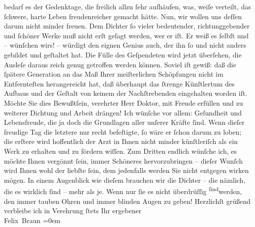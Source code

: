 \begin{ledgroupsized}[t]{13cm}
                    bedarf es der Gedenktage, die freilich allzu ſehr aufhäufen, was, weiſe
                    verteilt, das ſchwere, harte Leben freudenreicher gemacht hätte. Nun, wir wollen
                    uns deſſen darum nicht minder freuen.\pend
           \pstart
           {\pb}Dem Dichter ſo vieler bedeutender,
                    richtunggebender und ſchöner Werke muß nicht erſt geſagt werden, wer er iſt. Er
                    weiß es ſelbſt und – wünſchen wirs! – würdigt den eignen Genius auch, der ihn ſo
                    und nicht anders gebildet und geſtaltet hat. Die Fülle des Geſpendeten wird
                    jetzt überſehen, die Ausleſe daraus reich genug getroffen werden können. Soviel
                    iſt gewiß: daß die ſpätere Generation an das Maß Ihrer meiſterlichen Schöpfungen
                    nicht im Entfernteſten herangereicht hat, daß überhaupt das ſtrenge Künſtlertum
                    des Aufbaus und der Geſtalt von keinem der Nachſtrebenden eingehalten worden
                    iſt. Möchte Sie dies Bewußtſein, verehrter Herr Doktor, mit Freude erfüllen und
                    zu weiterer Dichtung und Arbeit drängen!\pend
           \pstart
           Ich wünſche vor allem: Geſundheit und Lebensfreude, die ja doch die Grundlagen
                    aller unſerer Kräfte ſind. Wenn dieſer freudige {\pb}Tag die letztere nur recht befeſtigte, ſo wäre er ſchon darum zu loben; die
                    erſtere wird hoffentlich der Arzt in Ihnen nicht minder künſtleriſch als ein
                    Werk zu erhalten und zu fördern wiſſen. Zum Dritten endlich wünſche ich, es
                    möchte Ihnen vergönnt ſein, immer Schöneres hervorzubringen – dieſer Wunſch wird
                    Ihnen wohl der liebſte ſein, dem jedenfalls werden Sie nicht entgegen wirken
                    mögen. In einem Augenblick wie dieſem brauchen wir die Dichter – die nämlich,
                    die es wirklich ſind – mehr als je. Wenn nur ſie es nicht überdrüſſig \substVorne{}\textsuperscript{ſind}\substDazwischen{}werden\substHinten{}, den immer tauben Ohren und immer blinden Augen zu geben!\pend
           \pstart
           Herzlichſt grüßend verbleibe ich in Verehrung ſtets Ihr ergebener{\\[\baselineskip]}\spacefill\mbox{Felix Braun}\pend
           \leftskip=0em{}\endnumbering{}\end{ledgroupsized}  \newcommand{\dateiname}{L02381}\newcommand{\titel}{Felix Braun an Arthur Schnitzler, 13. 5. 1922}\newcommand{\editorInnen}{Martin Anton Müller und Gerd-Hermann Susen}
      